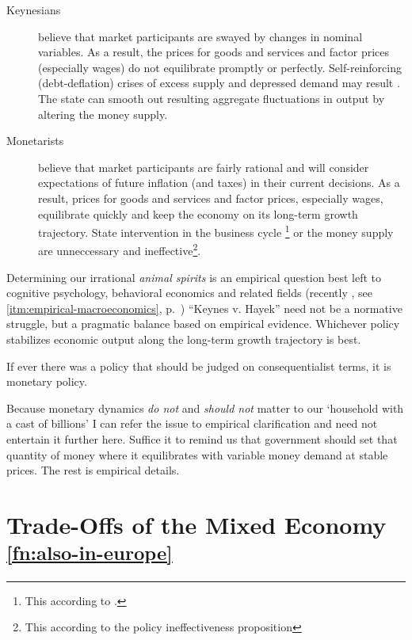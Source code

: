 \begin{enumerate}
	\begin{description}
		\item[Keynesians] believe that market participants are swayed by changes in nominal variables. As a result, the prices for goods and services and factor prices (especially wages) do not equilibrate promptly or perfectly. Self-reinforcing (debt-deflation) crises of excess supply and depressed demand may result \citep{Fisher1933}. The state can smooth out resulting aggregate fluctuations in output by altering the money supply. 
		\item[Monetarists] believe that market participants are fairly rational and will consider expectations of future inflation (and taxes) in their current decisions. As a result, prices for goods and services and factor prices, especially wages, equilibrate quickly and keep the economy on its long-term growth trajectory. State intervention in the business cycle
		\footnote{
			This according to .
		} 
		or the money supply are unneccessary and ineffective\footnote{
			This according to the policy ineffectiveness proposition}.
	\end{description}

	Determining our irrational \emph{animal spirits} \citep{Keynes1936} is an empirical question best left to cognitive psychology, behavioral economics and related fields (recently \citealt{Akerlof2010}, see \autoref{itm:empirical-macroeconomics}, p.~\pageref{itm:empirical-macroeconomics})	
	``Keynes v. Hayek'' \citep{Wapshott2011} need not be a normative struggle, but a pragmatic balance based on empirical evidence. 
	Whichever policy stabilizes economic output along the long-term growth trajectory is best. 
	
	If ever there was a policy that should be judged on consequentialist terms, it is monetary policy.
\end{enumerate}

Because monetary dynamics \emph{do not} and \emph{should not} matter to our `household with a cast of billions' I can refer the issue to empirical clarification and need not entertain it further here. Suffice it to remind us that government should set that quantity of money where it equilibrates with variable money demand at stable prices. The rest is empirical details.

\section[Trade-Offs]{Trade-Offs of the Mixed Economy \textsuperscript{\ref{fn:also-in-europe}}} \label{sec:trade-offs} 

